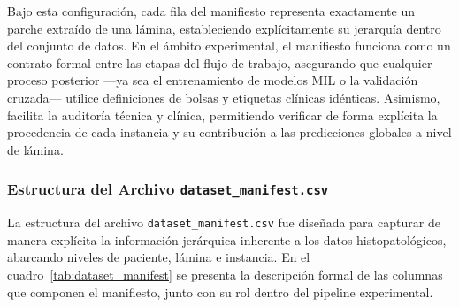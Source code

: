 Bajo esta configuración, cada fila del manifiesto representa exactamente un parche extraído de una lámina, estableciendo explícitamente su jerarquía dentro del conjunto de datos. En el ámbito experimental, el manifiesto funciona como un contrato formal entre las etapas del flujo de trabajo, asegurando que cualquier proceso posterior ---ya sea el entrenamiento de modelos MIL o la validación cruzada--- utilice definiciones de bolsas y etiquetas clínicas idénticas. Asimismo, facilita la auditoría técnica y clínica, permitiendo verificar de forma explícita la procedencia de cada instancia y su contribución a las predicciones globales a nivel de lámina.

\subsubsection{Estructura del Archivo \texttt{dataset\_manifest.csv}}
La estructura del archivo \texttt{dataset\_manifest.csv} fue diseñada para capturar de manera explícita la información jerárquica inherente a los datos histopatológicos, abarcando niveles de paciente, lámina e instancia. En el cuadro~\ref{tab:dataset_manifest} se presenta la descripción formal de las columnas que componen el manifiesto, junto con su rol dentro del pipeline experimental.

